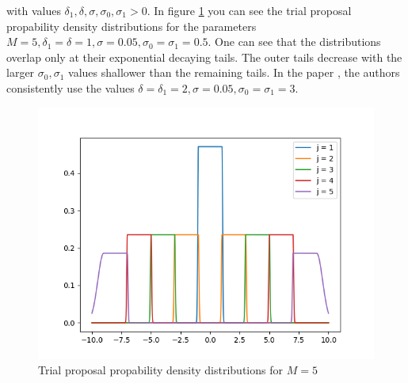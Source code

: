 \documentclass{scrartcl}
\begin{document}
    with values $\delta_1,\delta,\sigma,\sigma_0,\sigma_1>0$. In figure \ref{trial_proposals}
    you can see the trial proposal propability density distributions for the parameters $M=5, \delta_1=\delta=1,\sigma=0.05,\sigma_0=\sigma_1=0.5$. One can see that the
    distributions overlap only at their exponential decaying tails. The outer tails decrease with the larger $\sigma_0, \sigma_1$ values
    shallower than the remaining tails. In the paper \cite{lau2019}, the authors consistently use the values $\delta=\delta_1=2,\sigma=0.05,\sigma_0=\sigma_1=3$.

    \begin{figure}
        \centering
        \includegraphics[scale=0.6]{../figs/fig_2b.png}
        \caption{Trial proposal propability density distributions for $M=5$}
        \label{trial_proposals}
    \end{figure}
\end{document}
